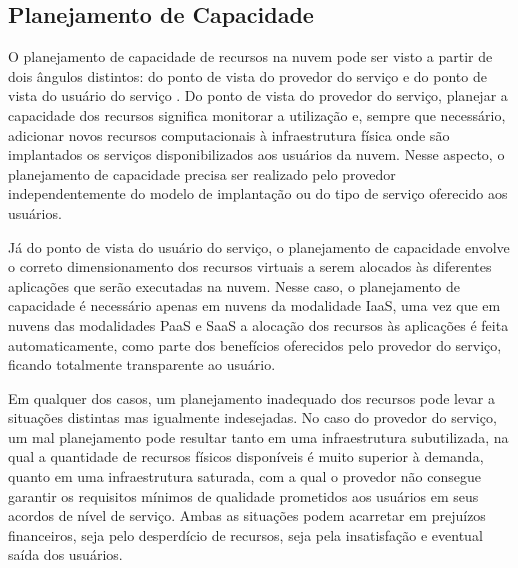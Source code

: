 

\subsection{Planejamento de Capacidade}

O planejamento de capacidade de recursos na nuvem pode ser visto a partir de dois ângulos distintos: do ponto de vista do provedor do serviço e do ponto de vista do usuário do serviço \cite{Menasce2009}. Do ponto de vista do provedor do serviço, planejar a capacidade dos recursos significa monitorar a utilização e, sempre que necessário, adicionar novos  recursos computacionais à infraestrutura física onde são implantados os serviços disponibilizados aos usuários da nuvem. Nesse aspecto, o planejamento de capacidade precisa ser realizado pelo provedor independentemente do modelo de implantação ou do tipo de serviço oferecido aos usuários.

Já do ponto de vista do usuário do serviço, o planejamento de capacidade envolve o correto dimensionamento dos recursos virtuais a serem alocados às diferentes aplicações que serão executadas na nuvem. Nesse caso, o planejamento de capacidade é necessário apenas em nuvens da modalidade IaaS, uma vez que em nuvens das modalidades PaaS e SaaS a alocação dos recursos às aplicações é feita automaticamente, como parte dos benefícios oferecidos pelo provedor do serviço, ficando totalmente transparente ao usuário. 

Em qualquer dos casos, um planejamento inadequado dos recursos pode levar a situações distintas mas igualmente indesejadas. No caso do provedor do serviço, um mal planejamento pode resultar tanto em uma infraestrutura subutilizada, na qual a quantidade de recursos físicos disponíveis é muito superior à demanda, quanto em uma infraestrutura saturada, com a qual o provedor não consegue garantir os requisitos mínimos de qualidade prometidos aos usuários em seus acordos de nível de serviço. Ambas as situações podem acarretar em prejuízos financeiros, seja pelo desperdício de recursos, seja pela insatisfação e eventual saída dos usuários.

